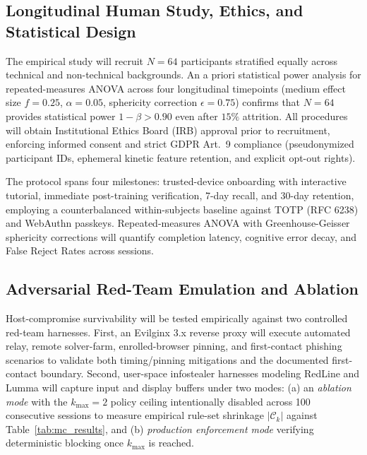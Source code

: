 \subsection{Longitudinal Human Study, Ethics, and Statistical Design}
The empirical study will recruit $N = 64$ participants stratified equally across technical and non-technical backgrounds. An a priori statistical power analysis for repeated-measures ANOVA across four longitudinal timepoints (medium effect size $f = 0.25$, $\alpha = 0.05$, sphericity correction $\epsilon = 0.75$) confirms that $N = 64$ provides statistical power $1 - \beta > 0.90$ even after $15\%$ attrition. All procedures will obtain Institutional Ethics Board (IRB) approval prior to recruitment, enforcing informed consent and strict GDPR Art.~9 compliance (pseudonymized participant IDs, ephemeral kinetic feature retention, and explicit opt-out rights).

The protocol spans four milestones: trusted-device onboarding with interactive tutorial, immediate post-training verification, 7-day recall, and 30-day retention, employing a counterbalanced within-subjects baseline against TOTP (RFC 6238) and WebAuthn passkeys. Repeated-measures ANOVA with Greenhouse-Geisser sphericity corrections will quantify completion latency, cognitive error decay, and False Reject Rates across sessions.

\subsection{Adversarial Red-Team Emulation and Ablation}
Host-compromise survivability will be tested empirically against two controlled red-team harnesses. First, an Evilginx 3.x reverse proxy will execute automated relay, remote solver-farm, enrolled-browser pinning, and first-contact phishing scenarios to validate both timing/pinning mitigations and the documented first-contact boundary. Second, user-space infostealer harnesses modeling RedLine and Lumma will capture input and display buffers under two modes: (a) an \emph{ablation mode} with the $k_{\max} = 2$ policy ceiling intentionally disabled across 100 consecutive sessions to measure empirical rule-set shrinkage $|\mathcal{C}_k|$ against Table~\ref{tab:mc_results}, and (b) \emph{production enforcement mode} verifying deterministic blocking once $k_{\max}$ is reached.

